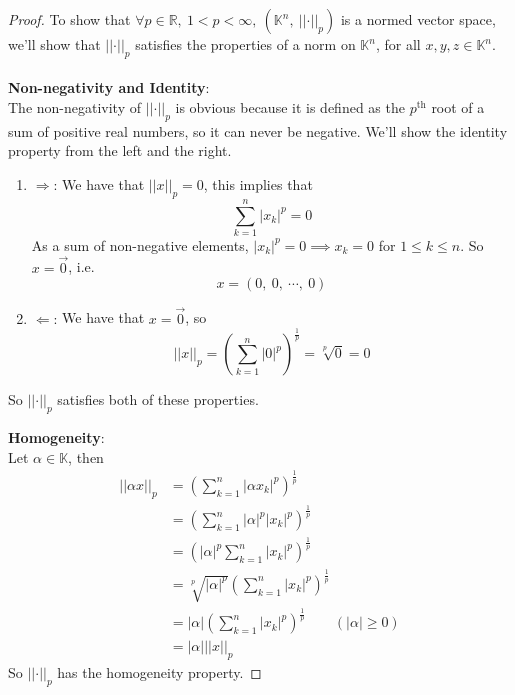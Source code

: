 \documentclass{article}
\newcommand{\be}{\begin{enumerate}}
\newcommand{\ee}{\end{enumerate}}
\newcommand{\norm}[1]{\left|\left|#1\right|\right|}
\newcommand{\abs}[1]{\left|#1\right|}
\newcommand{\parens}[1]{\left(#1\right)}
\newcommand{\R}{\mathbb{R}}
\newcommand{\K}{\mathbb{K}}
\begin{document}
    \begin{proof}
    To show that $\forall p \in \R,\ 1< p < \infty,\
    \parens{\K^n,\ \norm{\cdot}_p}$ is a normed vector space, we'll
    show that $\norm{\cdot}_p$ satisfies the properties of a norm on
    $\K^n$, for all $x,y,z \in \K^n$.\\\\
    \textbf{Non-negativity and Identity}:\\
    The non-negativity of $\norm{\cdot}_p$ is obvious because it is
    defined as the $p^{\text{th}}$ root of a sum of positive real
    numbers, so it can never be negative. We'll show the identity
    property from the left and the right.
    \be 
        \item[$\Longrightarrow$:] We have that $\norm{x}_{p} = 0$, 
        this implies that
        $$\sum_{k=1}^n \abs{x_k}^p = 0$$
        As a sum of non-negative elements, $\abs{x_k}^p = 0 
        \implies x_k = 0$ for $1 \leq k \leq n$. So $x = \vec{0}$, 
        i.e.
        $$x = \parens{0,\ 0,\ \cdots,\ 0}$$
        
        \item[$\Longleftarrow$:] We have that $x = \vec{0}$, so 
        $$\norm{x}_p = \parens{\sum_{k=1}^n\abs{0}^p}^{\frac{1}{p}} =
        \sqrt[p]{0} = 0$$
    \ee
    So $\norm{\cdot}_p$ satisfies both of these properties.
    
    \textbf{Homogeneity}:\\
    Let $\alpha \in \K$, then
    \begin{align*}
    \norm{\alpha x}_p &= \parens{\sum_{k=1}^n\abs{\alpha x_k}^p}^{
    \frac{1}{p}} \\
    &= \parens{\sum_{k=1}^n\abs{\alpha}^p \abs{x_k}^p}^{
    \frac{1}{p}} \\
    &= \parens{\abs{\alpha}^p\sum_{k=1}^n \abs{x_k}^p}^{
    \frac{1}{p}} \\
    &= \sqrt[p]{\abs{\alpha}^p}\parens{\sum_{k=1}^n \abs{x_k}^p}^{
    \frac{1}{p}} \\
    &= \abs{\alpha}\parens{\sum_{k=1}^n \abs{x_k}^p}^{
    \frac{1}{p}} \qquad (\abs{\alpha} \geq 0) \\
    &= \abs{\alpha}\norm{x}_p
    \end{align*}
    So $\norm{\cdot}_p$ has the homogeneity property.
    

\end{proof}
\end{document}
